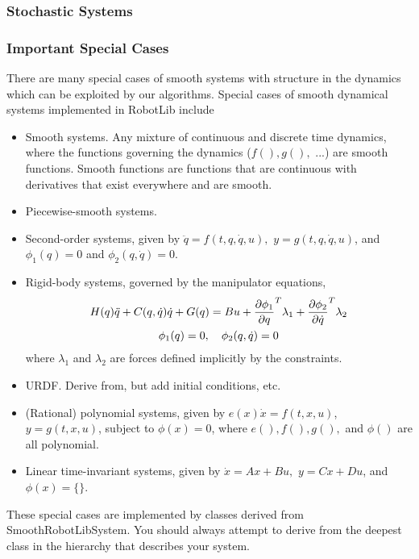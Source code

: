 \subsubsection{Stochastic Systems}


\subsubsection{Important Special Cases} \label{s:system_subclasses}

There are many special cases of smooth systems with structure in the
dynamics which can be exploited by our algorithms.  Special cases of
smooth dynamical systems implemented in RobotLib include
\begin{itemize}
\item Smooth systems.  Any mixture of continuous and discrete time dynamics, where the functions governing the dynamics ($f(), g(),$ ...) are smooth functions.  Smooth functions are functions that are continuous with derivatives that exist everywhere  and are smooth\cite{wiki:Smooth_Function}.   
\item Piecewise-smooth systems. 
\item Second-order systems, given by $\ddot{q} = f(t,q,\dot{q},u),$ $y
  = g(t,q,\dot{q},u)$, and $\phi_1(q)=0$ and $\phi_2(q,\dot{q})=0$.  
\item Rigid-body systems, governed by the manipulator
  equations, \begin{gather*}H(q)\ddot{q} + C(q,\dot{q})\dot{q} + G(q) = Bu + \frac{\partial \phi_1}{\partial q}^T
  \lambda_1 + \frac{\partial \phi_2}{\partial \dot{q}}^T \lambda_2\\ \phi_1(q) = 0, \quad
  \phi_2(q,\dot{q})=0\end{gather*} where $\lambda_1$ and $\lambda_2$
are forces defined implicitly by the constraints.   
\item URDF.  Derive from, but add initial conditions, etc.
\item (Rational) polynomial systems, given by $e(x)\dot{x} =
  f(t,x,u)$, $y = g(t,x,u)$, subject to $\phi(x)=0$, where $e(), f(),
  g(),$ and $\phi()$ are all polynomial.  
\item Linear time-invariant systems, given by $\dot{x} = Ax + Bu,$
  $y=Cx + Du$, and $\phi(x)=\{\}$.  
\end{itemize}
These special cases are implemented by classes derived from SmoothRobotLibSystem.
You should always attempt to derive from the deepest class in the hierarchy that
describes your system.  


